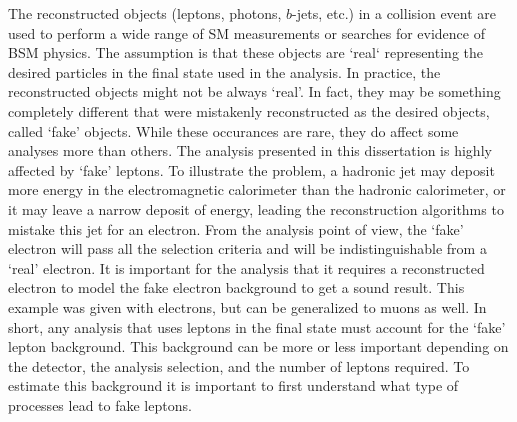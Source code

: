 The reconstructed objects (leptons, photons, $b$-jets, etc.) in a collision event are used to perform a wide range of SM measurements 
or searches for evidence of BSM physics. The assumption is that these objects are `real` representing the desired particles 
in the final state used in the analysis. 
In practice, the reconstructed objects might not be always `real'. In fact, they may be something completely different that
were mistakenly reconstructed as the desired objects, called `fake' objects.
While these occurances are rare, they do affect some analyses more than others.
The analysis presented in this dissertation is highly affected by 
 `fake' leptons. 
To illustrate the problem, a hadronic jet may deposit more energy in the electromagnetic calorimeter than the hadronic calorimeter, 
or it may leave a narrow deposit of energy, leading the reconstruction algorithms to mistake this jet for an electron.
From the analysis point of view, the `fake' electron will pass all the selection criteria and will be indistinguishable from 
a `real' electron. 
It is important for the analysis that it requires a reconstructed electron to model the fake electron background to get a sound 
result. This example was given with electrons, but can be generalized to muons as well. 
In short, any analysis that uses leptons in the final state must account for the `fake' lepton background. 
This background can be more or less important depending on the detector, the analysis selection, and the number of leptons required. 
To estimate this background it is important to first understand what type of processes lead to fake leptons.
